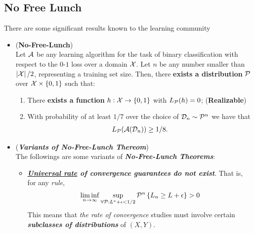 \documentclass[11pt]{article}
\begin{document}
\subsection{No Free Lunch}
There are some significant results known to the learning community
\begin{itemize}
\item  \begin{theorem} (\textbf{No-Free-Lunch}) \citep{shalev2014understanding}\\
Let ${\mathcal A}$ be any learning algorithm for the task of binary classification with respect to the $0$-$1$ loss over a domain ${\mathcal X}$. Let $n$ be any number smaller than $\left\lvert {\mathcal X} \right\rvert/2$, representing a training set size. Then, there \textbf{exists a distribution} ${\mathcal P}$ over ${\mathcal X} \times \left\{0,1\right\}$ such that:
\begin{enumerate}
\item There \textbf{exists a function} $h: {\mathcal X} \to \left\{0,1\right\}$ with $L_{{\mathcal P}}(h) = 0$; (\textbf{Realizable})
\item With probability of at least $1/7$ over the choice of  ${\mathcal D}_n \sim {\mathcal P}^n$ we have that
\begin{align*}
L_{{\mathcal P}}({\mathcal A}({\mathcal D}_n)) \ge 1/8.
\end{align*}
\end{enumerate}
\end{theorem}

\item \begin{remark} (\textbf{\emph{Variants of No-Free-Lunch Thereom}})\\
The followings are some variants of \emph{\textbf{No-Free-Lunch Theorems}}:
\begin{itemize}
\item \emph{\textbf{\underline{Universal rate} of convergence guarantees do not exist}}. 
That is, for any \emph{rule},
\begin{align*}
\liminf\limits_{n \rightarrow \infty} \sup_{\forall {\mathcal P}: L^{*} + \epsilon < 1/2}{\mathcal P}^{n}\left\{L_n \ge L + \epsilon\right\} > 0
\end{align*} 
This means that \emph{the rate of convergence} studies must involve certain \emph{\textbf{subclasses of distributions}} of $(X, Y)$. 


\end{itemize}
\end{remark}
\end{itemize}
\end{document}
